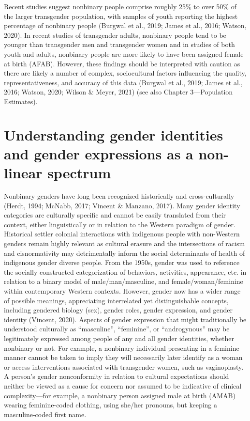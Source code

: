 \documentclass[
]{book}
\begin{document}
Recent studies suggest nonbinary people comprise roughly 25\% to over 50\% of the larger
transgender population, with samples of youth
reporting the highest percentage of nonbinary
people (Burgwal et al., 2019; James et al., 2016;
Watson, 2020). In recent studies of transgender
adults, nonbinary people tend to be younger than
transgender men and transgender women and in
studies of both youth and adults, nonbinary people are more likely to have been assigned female
at birth (AFAB). However, these findings should
be interpreted with caution as there are likely a
number of complex, sociocultural factors influencing the quality, representativeness, and accuracy of this data (Burgwal et al., 2019; James
et al., 2016; Watson, 2020; Wilson \& Meyer, 2021)
(see also Chapter 3---Population Estimates).

\hypertarget{understanding-gender-identities-and-gender-expressions-as-a-non-linear-spectrum}{%
\section*{Understanding gender identities and gender expressions as a non-linear spectrum}\label{understanding-gender-identities-and-gender-expressions-as-a-non-linear-spectrum}}

Nonbinary genders have long been recognized
historically and cross-culturally (Herdt, 1994;
McNabb, 2017; Vincent \& Manzano, 2017). Many
gender identity categories are culturally specific
and cannot be easily translated from their context, either linguistically or in relation to the
Western paradigm of gender. Historical settler
colonial interactions with indigenous people with
non-Western genders remain highly relevant as
cultural erasure and the intersections of racism
and cisnormativity may detrimentally inform the
social determinants of health of indigenous gender diverse people. From the 1950s, gender was
used to reference the socially constructed categorization of behaviors, activities, appearance, etc.
in relation to a binary model of male/man/masculine, and female/woman/feminine within contemporary Western contexts. However, gender
now has a wider range of possible meanings,
appreciating interrelated yet distinguishable concepts, including gendered biology (sex), gender
roles, gender expression, and gender identity
(Vincent, 2020). Aspects of gender expression
that might traditionally be understood culturally
as ``masculine'', ``feminine'', or ``androgynous'' may
be legitimately expressed among people of any
and all gender identities, whether nonbinary or
not. For example, a nonbinary individual presenting in a feminine manner cannot be taken
to imply they will necessarily later identify as a
woman or access interventions associated with
transgender women, such as vaginoplasty. A person's gender nonconformity in relation to cultural
expectations should neither be viewed as a cause
for concern nor assumed to be indicative of clinical complexity---for example, a nonbinary person
assigned male at birth (AMAB) wearing
feminine-coded clothing, using she/her pronouns,
but keeping a masculine-coded first name.
\end{document}
